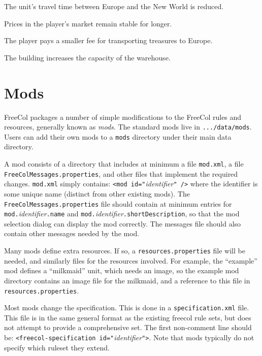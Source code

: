 \documentclass[12pt]{book}
\begin{document}
\affectsUnit

The unit's travel time between Europe and the New World is reduced.

\affectsPlayer

Prices in the player's market remain stable for longer.

\affectsPlayer

The player pays a smaller fee for transporting treasures to Europe.

\affectsBuilding

The building increases the capacity of the warehouse.

\hypertarget{Mods}{\chapter{Mods}}

FreeCol packages a number of simple modifications to the FreeCol rules
and resources, generally known as \emph{mods}.  The standard mods live
in \texttt{.../data/mods}.  Users can add their own mods to a
\texttt{mods} directory under their main data directory.

A mod consists of a directory that includes at minimum a file
\texttt{mod.xml}, a file \texttt{FreeColMessages.properties}, and
other files that implement the required changes.  \texttt{mod.xml}
simply contains: \texttt{<mod id="}\emph{identifier}\texttt{" />}
where the identifier is some unique name (distinct from other existing
mods).  The \texttt{FreeColMessages.properties} file should contain at
minimum entries for \texttt{mod.}\emph{identifier}\texttt{.name} 
and \texttt{mod.}\emph{identifier}\texttt{.shortDescription}, so that
the mod selection dialog can display the mod correctly.  The messages
file should also contain other messages needed by the mod.

Many mods define extra resources.  If so, a
\texttt{resources.properties} file will be needed, and similarly files
for the resources involved.  For example, the ``example'' mod defines
a ``milkmaid'' unit, which needs an image, so the example mod
directory contains an image file for the milkmaid, and a reference to
this file in \texttt{resources.properties}.

Most mods change the specification.  This is done in a
\texttt{specification.xml} file.  This file is in the same general
format as the existing freecol rule sets, but does not attempt to
provide a comprehensive set.  The first non-comment line should be:
\texttt{<freecol-specification id="}\emph{identifier}\texttt{">}.
Note that mods typically do not specify which ruleset they extend.
\end{document}
